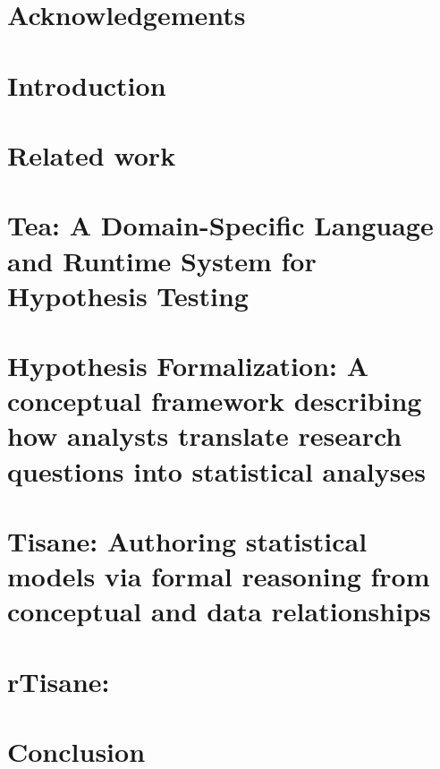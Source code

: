\documentclass[11pt]{book}
\begin{document}

{} %



\chapter*{Acknowledgements}



\tableofcontents{}
\listoffigures
\listoftables
\clearpage

\chapter {Introduction}


\chapter {Related work}


\chapter{Tea: A Domain-Specific Language and Runtime System for Hypothesis Testing} %
\label{chapter:tea}


\chapter{Hypothesis Formalization: A conceptual framework describing how analysts translate research questions into statistical analyses} %
\label{chapter:hypoForm}


\chapter{Tisane: Authoring statistical models via formal reasoning from conceptual and data relationships}
\label{chapter:tisane}


\chapter{rTisane: }
\label{chapter:rTisane}


\chapter{Conclusion}

\end{document}
